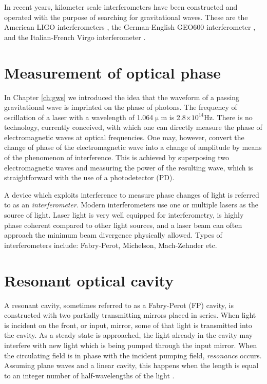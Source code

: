 In recent years, kilometer scale interferometers have been constructed and operated with the purpose of searching for gravitational waves. %
These are the American LIGO interferometers \cite{LIGO}, the German-English GEO600 interferometer \cite{GEO600}, and the Italian-French Virgo interferometer \cite{Virgo}.

\section{Measurement of optical phase}
In Chapter \ref{ch:gws} we introduced the idea that the waveform of a passing gravitational wave is imprinted on the phase of photons. %
The frequency of oscillation of a laser with a wavelength of 1.064$\upmu$m is 2.8$\times 10^{14}$Hz. %
There is no technology, currently conceived, with which one can directly measure the phase of electromagnetic waves at optical frequencies. %
One may, however, convert the change of phase of the electromagnetic wave into a change of amplitude by means of the phenomenon of interference. %
This is achieved by superposing two electromagnetic waves and measuring the power of the resulting wave, which is straightforward with the use of a photodetector (PD). %


A device which exploits interference to measure phase changes of light is referred to as an \emph{interferometer}. %
Modern interferometers use one or multiple lasers as the source of light. %
Laser light is very well equipped for interferometry, is highly phase coherent compared to other light sources, and a laser beam can often approach the minimum beam divergence physically allowed. %
Types of interferometers include: Fabry-Perot, Michelson, Mach-Zehnder etc.

\section{Resonant optical cavity}
A resonant cavity, sometimes referred to as a Fabry-Perot (FP) cavity, is constructed with two partially transmitting mirrors placed in series. %
When light is incident on the front, or input, mirror, some of that light is transmitted into the cavity. %
As a steady state is approached, the light already in the cavity may interfere with new light which is being pumped through the input mirror. %
When the circulating field is in phase with the incident pumping field, \emph{resonance} occurs. %
Assuming plane waves and a linear cavity, this happens when the length is equal to an integer number of half-wavelengths of the light \cite{Siegman}.

